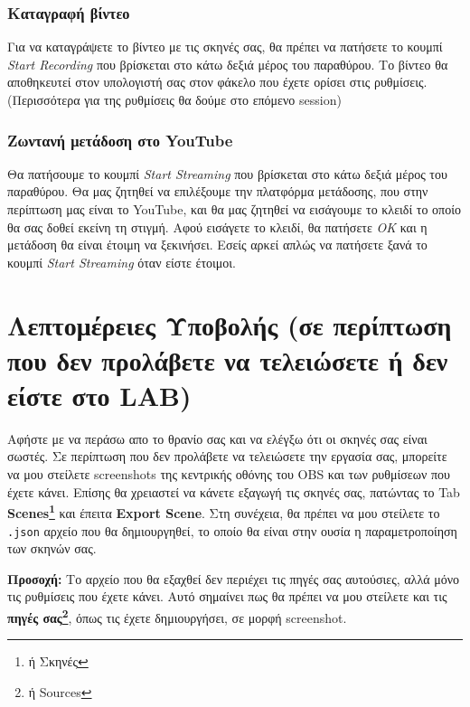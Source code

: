 \documentclass[12pt,a4paper]{article}
\begin{document}
\subsubsection{Καταγραφή βίντεο}
Για να καταγράψετε το βίντεο με τις σκηνές σας, θα πρέπει να πατήσετε το κουμπί \textit{Start Recording} που βρίσκεται
στο κάτω δεξιά μέρος του παραθύρου. Το βίντεο θα αποθηκευτεί στον υπολογιστή σας στον φάκελο που έχετε ορίσει στις ρυθμίσεις.
(Περισσότερα για της ρυθμίσεις θα δούμε στο επόμενο session)
\subsubsection{Ζωντανή μετάδοση στο YouTube}
Θα πατήσουμε το κουμπί \textit{Start Streaming} που βρίσκεται στο κάτω δεξιά μέρος του παραθύρου. Θα μας ζητηθεί να
επιλέξουμε την πλατφόρμα μετάδοσης, που στην περίπτωση μας είναι το YouTube, και θα μας ζητηθεί να εισάγουμε το κλειδί
το οποίο θα σας δοθεί εκείνη τη στιγμή. Αφού εισάγετε το κλειδί, θα πατήσετε \textit{OK} και η μετάδοση θα είναι έτοιμη να 
ξεκινήσει. Εσείς αρκεί απλώς να πατήσετε ξανά το κουμπί \textit{Start Streaming} όταν είστε έτοιμοι.






\section*{Λεπτομέρειες Υποβολής (σε περίπτωση που δεν προλάβετε να τελειώσετε ή δεν είστε στο LAB)}
\noindent Αφήστε με να περάσω απο το θρανίο σας και να ελέγξω ότι οι σκηνές σας είναι σωστές.
Σε περίπτωση που δεν προλάβετε να τελειώσετε την εργασία σας, μπορείτε να μου στείλετε
screenshots της κεντρικής οθόνης του OBS και των ρυθμίσεων που έχετε κάνει. Επίσης θα χρειαστεί να
κάνετε εξαγωγή τις σκηνές σας, πατώντας το Tab \textbf{Scenes\footnote{ή Σκηνές}} και έπειτα
\textbf{Export Scene}. Στη συνέχεια, θα πρέπει να μου στείλετε το \texttt{.json} αρχείο που θα δημιουργηθεί,
το οποίο θα είναι στην ουσία η παραμετροποίηση των σκηνών σας.
\begin{info}
  \textbf{Προσοχή:} Το αρχείο που θα εξαχθεί δεν περιέχει τις πηγές σας αυτούσιες, αλλά μόνο τις ρυθμίσεις που έχετε κάνει.
  Αυτό σημαίνει πως θα πρέπει να μου στείλετε και τις \textbf{πηγές σας\footnote{ή Sources}}, όπως τις έχετε δημιουργήσει, σε μορφή screenshot.
\end{info}
\end{document}
